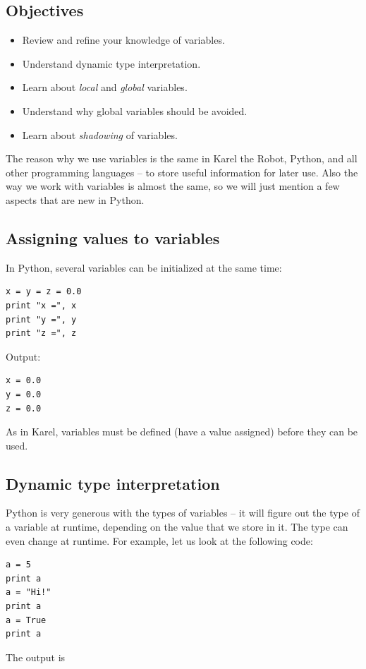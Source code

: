\subsection{Objectives}

\begin{itemize}
\item Review and refine your knowledge of variables.
\item Understand dynamic type interpretation.
\item Learn about {\em local} and {\em global} variables.
\item Understand why global variables should be avoided.
\item Learn about {\em shadowing} of variables.
\end{itemize}
The reason why we use variables is the same in Karel the Robot, Python, and all other programming 
languages -- to store useful information for later use. Also the way we work with variables is almost the 
same, so we will just mention a few aspects that are new in Python.

\subsection{Assigning values to variables}

In Python, several variables can be initialized at the same time:

\begin{verbatim}
x = y = z = 0.0
print "x =", x
print "y =", y
print "z =", z
\end{verbatim}
Output:

\begin{verbatim}
x = 0.0
y = 0.0
z = 0.0
\end{verbatim}
As in Karel, variables must be defined (have a value assigned) before they can be 
used. 

\subsection{Dynamic type interpretation}

Python is very generous with the types of variables -- it will figure out the type of a variable 
at runtime, depending on the value that we store in it. The type can even change at runtime.
For example, let us look at the following code:

\begin{verbatim}
a = 5
print a
a = "Hi!"
print a
a = True
print a
\end{verbatim}
The output is 

